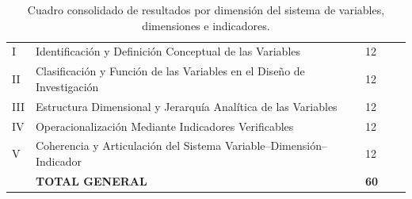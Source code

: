 \begin{table}[htbp]
\centering
\scriptsize
\caption{Cuadro consolidado de resultados por dimensión del sistema de variables, dimensiones e indicadores.}\label{tab:consolidado-variables}
\begin{tabularx}{\textwidth}{|C{0.8cm}|L{7.5cm}|C{1.8cm}|C{1.8cm}|X|}
\hline
{}
 &  &  &  &  \\ \hline
I & Identificación y Definición Conceptual de las Variables & 12 & & \\ \hline
{}
II & Clasificación y Función de las Variables en el Diseño de Investigación & 12 & & \\ \hline
III & Estructura Dimensional y Jerarquía Analítica de las Variables & 12 & & \\ \hline
{}
IV & Operacionalización Mediante Indicadores Verificables & 12 & & \\ \hline
V & Coherencia y Articulación del Sistema Variable--Dimensión--Indicador & 12 & & \\ \hline
{}
& \textbf{TOTAL GENERAL} & \textbf{60} & & \\ \hline
\end{tabularx}
\normalsize
\end{table}
